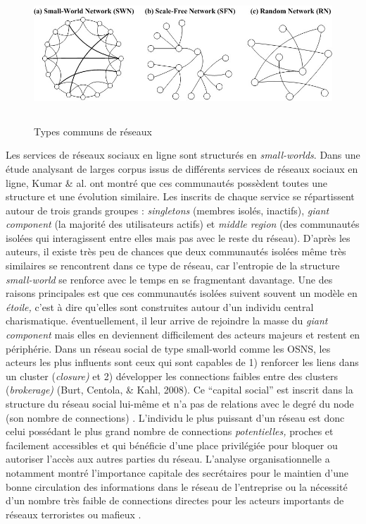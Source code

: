 \begin{figure}
    \centering
    \includegraphics[width=6.3449in,height=2.0224in]{figures/chap3/chapitre3-img4.jpg}
    \caption{Types communs de réseaux}
\end{figure}

Les services de réseaux sociaux en ligne sont structurés en \textit{small-worlds}. Dans une étude analysant de larges corpus issus de différents services de réseaux sociaux en ligne, Kumar \& al. \citep{Kumar2006} ont montré que ces communautés possèdent toutes une structure et une évolution similaire. Les inscrits de chaque service se répartissent autour de trois grands groupes : \textit{singletons} (membres isolés, inactifs), \textit{giant component} (la majorité des utilisateurs actifs) et \textit{middle region} (des communautés isolées qui interagissent entre elles mais pas avec le reste du réseau). D{\textquoteright}après les auteurs, il existe très peu de chances que deux communautés isolées m\^eme très similaires se rencontrent dans ce type de réseau, car l{\textquoteright}entropie de la structure \textit{small-world }se renforce avec le temps en se fragmentant davantage. Une des raisons principales est que ces communautés isolées suivent souvent un modèle en \textit{étoile, }c{\textquoteright}est à dire qu{\textquoteright}elles sont construites autour d{\textquoteright}un individu central charismatique. éventuellement, il leur arrive de rejoindre la masse du \textit{giant component} mais elles en deviennent difficilement des acteurs majeurs et restent en périphérie. Dans un réseau social de type small-world comme les OSNS, les acteurs les plus influents sont ceux qui sont capables de 1) renforcer les liens dans un cluster (\textit{closure)} et 2) développer les connections faibles entre des clusters (\textit{brokerage)} (Burt, Centola, \& Kahl, 2008). Ce {\textquotedblleft}capital social{\textquotedblright} est inscrit dans la structure du réseau social lui-m\^eme \citep{Lin1999} et n{\textquoteright}a pas de relations avec le degré du node (son nombre de connections) \citep{Cha2010}. L{\textquoteright}individu le plus puissant d{\textquoteright}un réseau est donc celui possédant le plus grand nombre de connections \textit{potentielles, }proches et facilement accessibles et qui bénéficie d{\textquoteright}une place privilégiée pour bloquer ou autoriser l{\textquoteright}accès aux autres parties du réseau. L{\textquoteright}analyse organisationnelle a notamment montré l{\textquoteright}importance capitale des secrétaires pour le maintien d{\textquoteright}une bonne circulation des informations dans le réseau de l{\textquoteright}entreprise ou la nécessité d{\textquoteright}un nombre très faible de connections directes pour les acteurs importants de réseaux terroristes ou mafieux \citep{Russel2011}.
